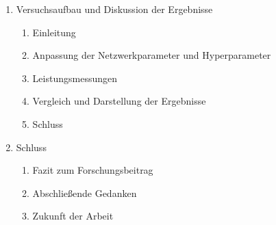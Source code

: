 \begin{enumerate}
  \item Versuchsaufbau und Diskussion der Ergebnisse
  \begin{enumerate}
    \item Einleitung
    \item Anpassung der Netzwerkparameter und Hyperparameter
    \item Leistungsmessungen
    \item Vergleich und Darstellung der Ergebnisse
    \item Schluss
  \end{enumerate}

  \item Schluss
  \begin{enumerate}
    \item Fazit zum Forschungsbeitrag
    \item Abschließende Gedanken
    \item Zukunft der Arbeit
  \end{enumerate}
\end{enumerate}










